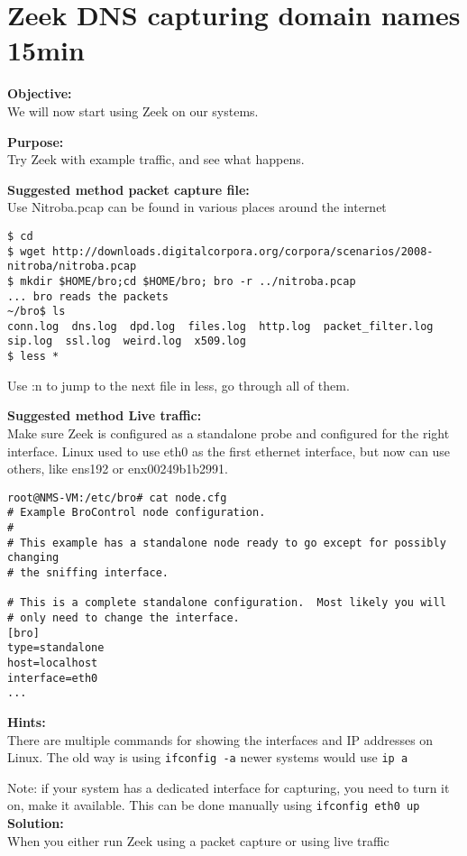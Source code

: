 \documentclass[a4paper,11pt,notitlepage]{report}
\begin{document}
\chapter{Zeek DNS capturing domain names 15min}
\label{ex:zeekdnsbasic}


{\bf Objective:} \\
We will now start using Zeek on our systems.


{\bf Purpose:}\\
Try Zeek with example traffic, and see what happens.


{\bf Suggested method packet capture file:}\\
Use Nitroba.pcap can be found in various places around the internet

\begin{verbatim}
$ cd
$ wget http://downloads.digitalcorpora.org/corpora/scenarios/2008-nitroba/nitroba.pcap
$ mkdir $HOME/bro;cd $HOME/bro; bro -r ../nitroba.pcap
... bro reads the packets
~/bro$ ls
conn.log  dns.log  dpd.log  files.log  http.log  packet_filter.log
sip.log  ssl.log  weird.log  x509.log
$ less *
\end{verbatim}

Use :n to jump to the next file in less, go through all of them.

{\bf Suggested method Live traffic:}\\
Make sure Zeek is configured as a standalone probe and configured for the right interface. Linux used to use eth0 as the first ethernet interface, but now can use others, like ens192 or enx00249b1b2991.

\begin{verbatim}
root@NMS-VM:/etc/bro# cat node.cfg
# Example BroControl node configuration.
#
# This example has a standalone node ready to go except for possibly changing
# the sniffing interface.

# This is a complete standalone configuration.  Most likely you will
# only need to change the interface.
[bro]
type=standalone
host=localhost
interface=eth0
...
\end{verbatim}


{\bf Hints:}\\
There are multiple commands for showing the interfaces and IP addresses on Linux. The old way is using \verb+ifconfig -a+ newer systems would use \verb+ip a+

Note: if your system has a dedicated interface for capturing, you need to turn it on, make it available. This can be done manually using \verb+ifconfig eth0 up+
{\bf Solution:}\\
When you either run Zeek using a packet capture or using live traffic
\end{document}
